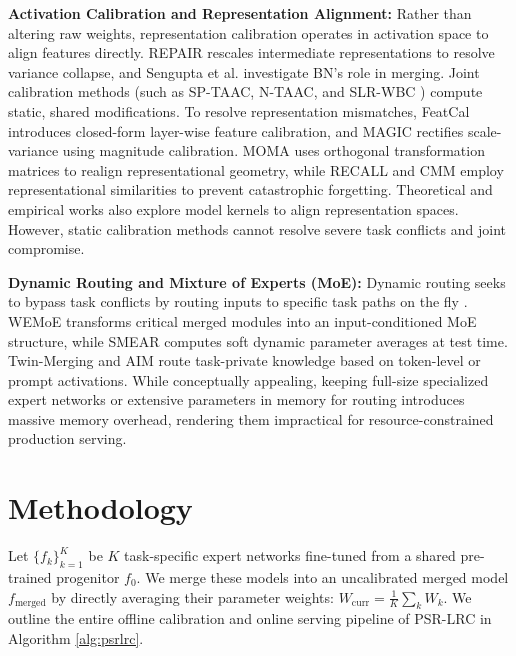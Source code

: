 \documentclass{article}
\theoremstyle{plain}
\theoremstyle{definition}
\theoremstyle{remark}
\begin{document}
\textbf{Activation Calibration and Representation Alignment:} Rather than altering raw weights, representation calibration operates in activation space to align features directly. REPAIR \cite{jordan2023repair} rescales intermediate representations to resolve variance collapse, and Sengupta et al. \cite{sengupta2023rethinking} investigate BN's role in merging. Joint calibration methods (such as SP-TAAC, N-TAAC, and SLR-WBC \cite{pragmatist2026slrwbc}) compute static, shared modifications. To resolve representation mismatches, FeatCal \cite{gu2026featcal} introduces closed-form layer-wise feature calibration, and MAGIC \cite{li2025magic} rectifies scale-variance using magnitude calibration. MOMA \cite{kong2024moma} uses orthogonal transformation matrices to realign representational geometry, while RECALL \cite{recall2025} and CMM \cite{cmm2025} employ representational similarities to prevent catastrophic forgetting. Theoretical and empirical works also explore model kernels \cite{averaged2025} to align representation spaces. However, static calibration methods cannot resolve severe task conflicts and joint compromise.

\textbf{Dynamic Routing and Mixture of Experts (MoE):} Dynamic routing seeks to bypass task conflicts by routing inputs to specific task paths on the fly \cite{shazeer2017outrageously, minimalist2026mspr}. WEMoE \cite{tang2024wemoe} transforms critical merged modules into an input-conditioned MoE structure, while SMEAR \cite{muqeeth2024smear} computes soft dynamic parameter averages at test time. Twin-Merging \cite{lu2024twin} and AIM \cite{nobari2025aim} route task-private knowledge based on token-level or prompt activations. While conceptually appealing, keeping full-size specialized expert networks or extensive parameters in memory for routing introduces massive memory overhead, rendering them impractical for resource-constrained production serving.

\section{Methodology}
\label{sec:method}
Let $\{f_k\}_{k=1}^K$ be $K$ task-specific expert networks fine-tuned from a shared pre-trained progenitor $f_0$. We merge these models into an uncalibrated merged model $f_{\text{merged}}$ by directly averaging their parameter weights: $W_{\text{curr}} = \frac{1}{K}\sum_k W_k$. We outline the entire offline calibration and online serving pipeline of PSR-LRC in Algorithm \ref{alg:psrlrc}.
\end{document}

